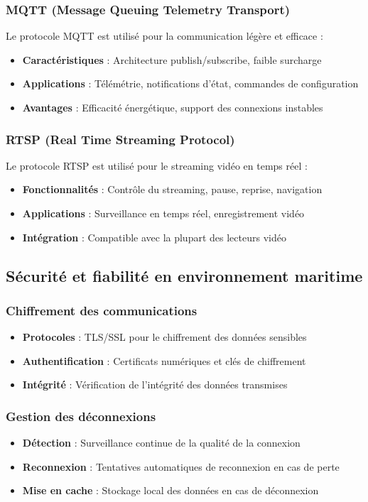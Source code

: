 {\subsubsection{MQTT (Message Queuing Telemetry Transport)}
Le protocole MQTT est utilisé pour la communication légère et efficace :
\begin{itemize}
    \item \textbf{Caractéristiques} : Architecture publish/subscribe, faible surcharge
    \item \textbf{Applications} : Télémétrie, notifications d'état, commandes de configuration
    \item \textbf{Avantages} : Efficacité énergétique, support des connexions instables
\end{itemize}

\subsubsection{RTSP (Real Time Streaming Protocol)}
Le protocole RTSP est utilisé pour le streaming vidéo en temps réel :
\begin{itemize}
    \item \textbf{Fonctionnalités} : Contrôle du streaming, pause, reprise, navigation
    \item \textbf{Applications} : Surveillance en temps réel, enregistrement vidéo
    \item \textbf{Intégration} : Compatible avec la plupart des lecteurs vidéo
\end{itemize}

\subsection{Sécurité et fiabilité en environnement maritime}
\subsubsection{Chiffrement des communications}
\begin{itemize}
    \item \textbf{Protocoles} : TLS/SSL pour le chiffrement des données sensibles
    \item \textbf{Authentification} : Certificats numériques et clés de chiffrement
    \item \textbf{Intégrité} : Vérification de l'intégrité des données transmises
\end{itemize}

\subsubsection{Gestion des déconnexions}
\begin{itemize}
    \item \textbf{Détection} : Surveillance continue de la qualité de la connexion
    \item \textbf{Reconnexion} : Tentatives automatiques de reconnexion en cas de perte
    \item \textbf{Mise en cache} : Stockage local des données en cas de déconnexion
\end{itemize}

}
